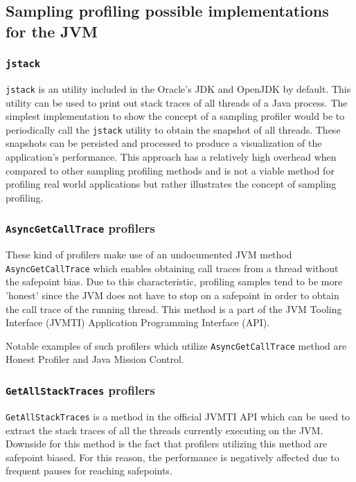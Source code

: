 \documentclass[..thesis.tex]{subfiles}
\begin{document}
\subsection{Sampling profiling possible implementations for the JVM}

\subsubsection{\texttt{jstack}}
\texttt{jstack} is an utility included in the Oracle's JDK and OpenJDK by default. This utility can be used to print out stack traces of all threads of a Java process.\cite{jstack} The simplest implementation to show the concept of a sampling profiler would be to periodically call the \texttt{jstack} utility to obtain the snapshot of all threads. These snapshots can be persisted and processed to produce a visualization of the application's performance. This approach has a relatively high overhead when compared to other sampling profiling methods and is not a viable method for profiling real world applications but rather illustrates the concept of sampling profiling.

\subsubsection{\texttt{AsyncGetCallTrace} profilers}
These kind of profilers make use of an undocumented JVM method \texttt{Async\-Get\-Call\-Trace} \cite{agct_source} which enables obtaining call traces from a thread without the safepoint bias. Due to this characteristic, profiling samples tend to be more 'honest' since the JVM does not have to stop on a safepoint in order to obtain the call trace of the running thread. This method is a part of the JVM Tooling Interface (JVMTI) Application Programming Interface (API).

Notable examples of such profilers which utilize \texttt{Async\-Get\-Call\-Trace} method  are Honest Profiler and Java Mission Control. 


\subsubsection{\texttt{GetAllStackTraces} profilers}
\texttt{GetAllStackTraces} is a method in the official JVMTI API which can be used to extract the stack traces of all the threads currently executing on the JVM\cite{jvmti_doc}. Downside for this method is the fact that profilers utilizing this method are safepoint biased. For this reason, the performance is negatively affected due to frequent pauses for reaching safepoints.
\end{document}
